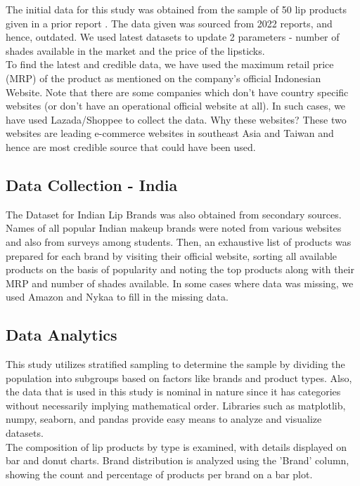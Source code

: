 \documentclass{article}
\begin{document}
\noindent The initial data for this study was obtained from the sample of 50 lip products given in a prior report \cite{casestudy}. The data given was sourced from 2022 reports, and hence, outdated. We used latest datasets to update 2 parameters - number of shades available in the market and the price of the lipsticks. \\

\noindent To find the latest and credible data, we have used the maximum retail price (MRP) of the product as mentioned on the company's official Indonesian Website. Note that there are some companies which don't have country specific websites (or don't have an operational official website at all). In such cases, we have used Lazada/Shoppee to collect the data. Why these websites? These two websites are leading e-commerce websites in southeast Asia and Taiwan and hence are most credible source that could have been used.

\subsection{Data Collection - India}
The Dataset for Indian Lip Brands was also obtained from secondary sources. Names of all popular Indian makeup brands were noted from various websites \cite{paletteTataCliq} \cite{timesprimeLipsticks2023} \cite{timesprimeMakeupBrands} and also from surveys among students. Then, an exhaustive list of products was prepared for each brand by visiting their official website, sorting all available products on the basis of popularity and noting the top products along with their MRP and number of shades available.
\noindent In some cases where data was missing, we used Amazon and Nykaa to fill in the missing data.

\subsection{Data Analytics}
This study utilizes stratified sampling to determine the sample by dividing the population into subgroups based on factors like brands and product types. Also, the data that is used in this study is nominal in nature since it has categories without necessarily implying mathematical order. Libraries such as matplotlib, numpy, seaborn, and pandas provide easy means to analyze and visualize datasets. \\

\noindent The composition of lip products by type is examined, with details displayed on bar and donut charts. Brand distribution is analyzed using the 'Brand' column, showing the count and percentage of products per brand on a bar plot. \\
\end{document}
